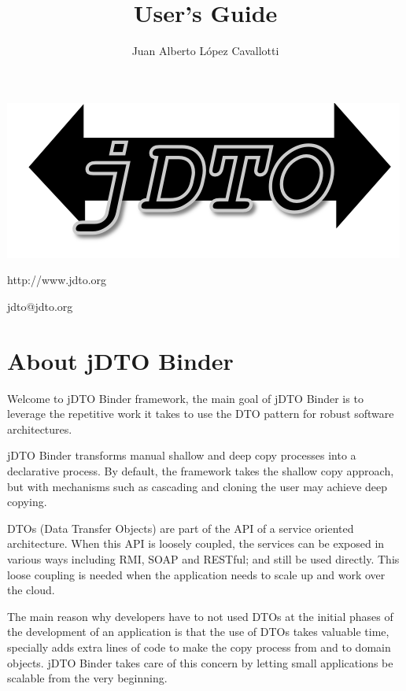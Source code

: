 \documentclass[11pt]{article}
\title{\JDTO \JDV User's Guide}
\author{Juan Alberto López Cavallotti}
\newcommand{\JDTO}{jDTO Binder\xspace}
\begin{document}
\maketitle

\begin{center}

\includegraphics[scale=1]{logo.png}

\begin{huge}
 http://www.jdto.org
\end{huge}

\begin{LARGE}
 jdto@jdto.org
\end{LARGE}
\end{center}


\newpage
\tableofcontents

\newpage


\section{About \JDTO}


Welcome to \JDTO framework, the main goal of \JDTO is to leverage the repetitive work it takes to use
the DTO pattern for robust software architectures. 

\JDTO transforms manual shallow and deep copy processes into a declarative process. By default, the framework
takes the shallow copy approach, but with mechanisms such as cascading and cloning the user may achieve deep
copying.

DTOs (Data Transfer Objects) are part of the API of a service oriented architecture. When this API is loosely coupled, the services can be exposed in various ways including RMI, SOAP and RESTful; and still be used directly. This loose coupling is needed when the application needs to scale up and work over the cloud.

The main reason why developers have to not used DTOs at the initial phases of the development of an application is that the use of DTOs takes valuable time, specially adds extra lines of code to make the copy process from and to domain objects. \JDTO takes care of this concern by letting small applications be scalable from the very beginning.
\end{document}
